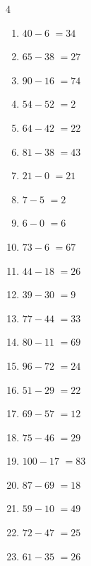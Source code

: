 \begin{multicols}{4}
\begin{enumerate}
  \item $40-6$
        $=34$

\columnbreak %

  \item $65-38$
        $=27$

  \item $90-16$
        $=74$

  \item $54-52$
        $=2$

  \item $64-42$
        $=22$

  \item $81-38$
        $=43$

  \item $21-0$
        $=21$

  \item $7-5$
        $=2$

  \item $6-0$
        $=6$

  \item $73-6$
        $=67$

  \item $44-18$
        $=26$

  \item $39-30$
        $=9$

  \item $77-44$
        $=33$

  \item $80-11$
        $=69$

  \item $96-72$
        $=24$

  \item $51-29$
        $=22$

  \item $69-57$
        $=12$

  \item $75-46$
        $=29$

  \item $100-17$
        $=83$

  \item $87-69$
        $=18$

  \item $59-10$
        $=49$

  \item $72-47$
        $=25$

  \item $61-35$
        $=26$


\end{enumerate}
\end{multicols}
